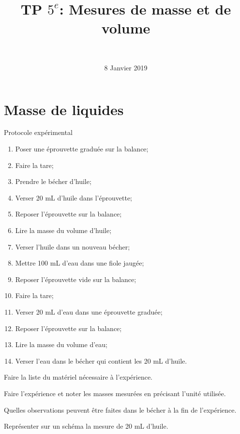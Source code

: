 \documentclass[a4paper,11pt]{exam}
\author{\ }
\date{8 Janvier 2019}
\title{TP $5^e$: Mesures de masse et de volume}
\begin{document}
	\maketitle

\section{Masse de liquides}\label{part:liquide}

\begin{doc}
	\caption{Protocole expérimental}
	\label{doc:proto1}
	\begin{multicols}{2}
			
		\begin{enumerate}[label=\arabic*)]
			
			\item Poser une éprouvette graduée sur la balance;
			\item Faire la tare;
			\item Prendre le bécher d'huile;
			\item Verser 20 mL d'huile dans l'éprouvette;
			\item Reposer l'éprouvette sur la balance;
			\item Lire la masse du volume d'huile;
			\item Verser l'huile dans un nouveau bécher;
			\item Mettre 100 mL d'eau dans une fiole jaugée;
			\item Reposer l'éprouvette vide sur la balance;
			\item Faire la tare;
			\item Verser 20 mL d'eau dans une éprouvette graduée;
			\item Reposer l'éprouvette sur la balance;
			\item Lire la masse du volume d'eau;
			\item Verser l'eau dans le bécher qui contient les 20 mL d'huile.
			
			
		\end{enumerate}
	\end{multicols}
\end{doc}	


\begin{questions}
	
	
	\question Faire la liste du matériel nécessaire à l'expérience.
	
	\fillwithdottedlines{3cm}
	
	\question Faire l'expérience et noter les masses mesurées en précisant l'unité utilisée.
	
	\fillwithdottedlines{1cm}	
	
	\question Quelles observations peuvent être faites dans le bécher à la fin de l'expérience.
	\fillwithdottedlines{1.5cm}
	
	\question Représenter sur un schéma la mesure de 20 mL d'huile.
	
	\makeemptybox{5.5cm}
\end{questions}
\end{document}
